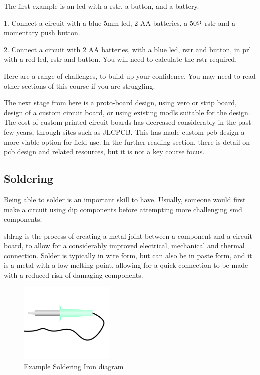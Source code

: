 \documentclass[a4paper,11pt]{report}
\newcommand{\Quiz}[1] %
{
\par\noindent %
\phantomsection %
\todo[inline, color=blue!30]{\textbf{#1}} %
\vspace{1em} %
}
\begin{document}
The first example is an \gls{led} with a \gls{rstr}, a button, and a battery.

\Quiz{Challenges}

1. Connect a circuit with a blue 5mm led, 2 AA batteries, a 50$\ohm$ \gls{rstr} and a momentary push button.

2. Connect a circuit with 2 AA batteries, with a blue \gls{led}, \gls{rstr} and button, in \gls{prl} with a red \gls{led}, \gls{rstr} and button. You will need to calculate the \gls{rstr} required.

Here are a range of challenges, to build up your confidence. You may need to read other sections of this course if you are struggling.

The next stage from here is a proto-board design, using vero or strip board, design of a custom circuit board, or using existing \gls{modl}s suitable for the design. The cost of custom printed circuit boards has decreased considerably in the past few years, through sites such as JLCPCB. This has made custom \gls{pcb} design a more viable option for field use.
In the further reading section, there is detail on \gls{pcb} design and related resources, but it is not a key course focus.

\vspace*{1\baselineskip}

\subsection{Soldering}

Being able to solder is an important skill to have. Usually, someone would first make a circuit using \gls{dip} components before attempting more challenging \gls{smd} components.

\gls{sldrng} is the process of creating a metal joint between a component and a circuit board, to allow for a considerably improved electrical, mechanical and thermal connection. Solder is typically in wire form, but can also be in paste form, and it is a metal with a low melting point, allowing for a quick connection to be made with a reduced risk of damaging components.

\begin{figure}[H]
\centering
\includegraphics[width=0.4\textwidth]{solderingiron}
\caption{Example Soldering Iron diagram}
\end{figure}
\end{document}
